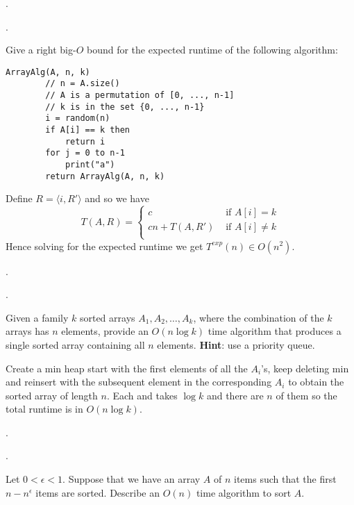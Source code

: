 \documentclass{article}
\begin{document}
\begin{exer}[]. \begin{cate}. \end{cate}
    Give a right big-$O$ bound for the expected runtime of the following algorithm: \begin{lstlisting}[language={}]
        ArrayAlg(A, n, k)
        // n = A.size()
        // A is a permutation of [0, ..., n-1]
        // k is in the set {0, ..., n-1}
        i = random(n)
        if A[i] == k then
            return i
        for j = 0 to n-1
            print("a")
        return ArrayAlg(A, n, k)
    \end{lstlisting}
\end{exer}

\begin{solution}
    Define $R = \langle i, R' \rangle$ and so we have 
    \[ T(A, R) = \begin{cases}
        c             & \text{ if } A[i] = k \\ 
        cn + T(A, R') & \text{ if } A[i] \neq k \\ 
    \end{cases} \]
    Hence solving for the expected runtime we get $T^{exp}(n) \in O(n^2)$. 
\end{solution}

\begin{exer}[]. \begin{cate}. \end{cate}
    Given a family $k$ sorted arrays $A_1, A_2, \ldots, A_k$, where the combination of the $k$ arrays has $n$ elements, provide an $O(n \log k)$ time algorithm that produces a single sorted array containing all $n$ elements. \textbf{Hint}: use a priority queue.
\end{exer}

\begin{solution}
    Create a min heap start with the first elements of all the $A_i$'s, keep deleting min and reinsert with the subsequent element in the corresponding $A_i$ to obtain the sorted array of length $n$. Each  and  takes $\log k$ and there are $n$ of them so the total runtime is in $O(n \log k)$. 
\end{solution}

\begin{exer}[]. \begin{cate}[Epsilon]. \end{cate}
    Let $0 < \epsilon < 1$. Suppose that we have an array $A$ of $n$ items such that the first $n - n^\epsilon$ items are sorted. Describe an $O(n)$ time algorithm to sort $A$.
\end{exer}
\end{document}
